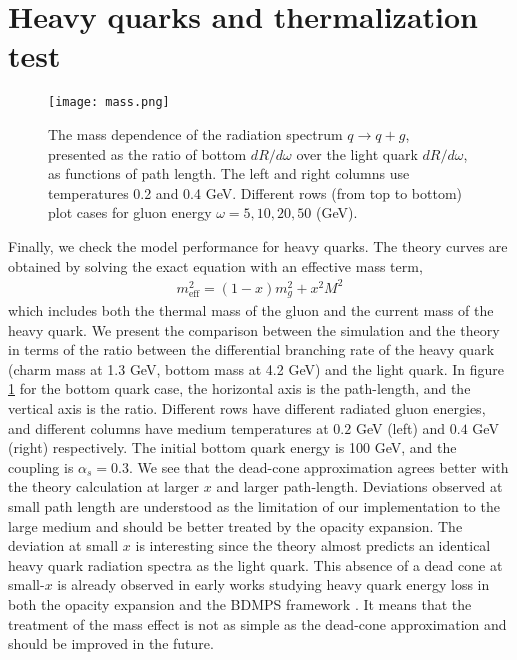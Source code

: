 \section{Heavy quarks and thermalization test}
\begin{figure}
\singlespacing
\texttt{[image: mass.png]}
\caption[The mass dependence of the radiation spectrum $q\rightarrow q+g$,]{The mass dependence of the radiation spectrum $q\rightarrow q+g$, presented as the ratio of bottom $dR/d\omega$ over the light quark $dR/d\omega$, as functions of path length. The left and right columns use temperatures 0.2 and 0.4 GeV. Different rows (from top to bottom) plot cases for gluon energy $\omega = 5, 10, 20, 50$ (GeV).}
\label{fig:mass}
\end{figure}
Finally, we check the model performance for heavy quarks.
The theory curves are obtained by solving the exact equation with an effective mass term,
\begin{eqnarray}
m_{\textrm{eff}}^2 = (1-x)m_g^2 + x^2 M^2
\end{eqnarray}
which includes both the thermal mass of the gluon and the current mass of the heavy quark.
We present the comparison between the simulation and the theory in terms of the ratio between the differential branching rate of the heavy quark (charm mass at 1.3 GeV, bottom mass at 4.2 GeV) and the light quark.
In figure \ref{fig:mass} for the bottom quark case, the horizontal axis is the path-length, and the vertical axis is the ratio.
Different rows have different radiated gluon energies, and different  columns have medium temperatures at $0.2$ GeV (left) and $0.4$ GeV (right) respectively.
The initial bottom quark energy is 100 GeV, and the coupling is $\alpha_s=0.3$.
We see that the dead-cone approximation agrees better with the theory calculation at larger $x$ and larger path-length.
Deviations observed at small path length are understood as the limitation of our implementation to the large medium and should be better treated by the opacity expansion. 
The deviation at small $x$ is interesting since the theory almost predicts an identical heavy quark radiation spectra as the light quark. 
This absence of a dead cone at small-$x$ is already observed in early works studying heavy quark energy loss in both the opacity expansion and the BDMPS framework \cite{Armesto:2003jh}.
It means that the treatment of the mass effect is not as simple as the dead-cone approximation and should be improved in the future.

